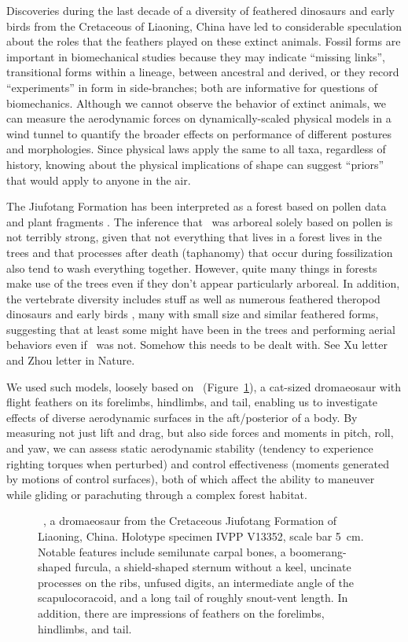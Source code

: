 Discoveries during the last decade of a diversity of feathered dinosaurs and early birds from the Cretaceous of Liaoning, China have led to considerable speculation about the roles that the feathers played on these extinct animals. Fossil forms are important in biomechanical studies because they may indicate ``missing links'', transitional forms within a lineage, between ancestral and derived, or they record ``experiments'' in form in side-branches; both are informative for questions of biomechanics.  Although we cannot observe the behavior of extinct animals, we can measure the aerodynamic forces on dynamically-scaled physical models in a wind tunnel to quantify the broader effects on performance of different postures and morphologies.  Since physical laws apply the same to all taxa, regardless of history, knowing about the physical implications of shape can suggest ``priors'' that would apply to anyone in the air. 
  
The Jiufotang Formation has been interpreted as a forest based on pollen data and plant fragments \cite{someone}.  The inference that \Mgui\ was arboreal solely based on pollen is not terribly strong, given that not everything that lives in a forest lives in the trees and that processes after death (taphanomy) that occur during fossilization also tend to wash everything together.  However, quite many things in forests make use of the trees even if they don't appear particularly arboreal. In addition, the vertebrate diversity includes stuff as well as numerous feathered theropod dinosaurs and early birds \cite{someone}, many with small size and similar feathered forms, suggesting that at least some might have been in the trees and performing aerial behaviors even if \Mgui\ was not. Somehow this needs to be dealt with. See Xu letter and Zhou letter in Nature. 
  
We used such models, loosely based on \Microraptorgui\ (Figure~\ref{fig:mgui}), a cat-sized dromaeosaur with flight feathers on its forelimbs, hindlimbs, and tail, enabling us to investigate effects of diverse aerodynamic surfaces in the aft/posterior of a body.  By measuring not just lift and drag, but also side forces and moments in pitch, roll, and yaw, we can assess static aerodynamic stability (tendency to experience righting torques when perturbed) and control effectiveness (moments generated by motions of control surfaces), both of which affect the ability to maneuver while gliding or parachuting through a complex forest habitat. 
\begin{figure}
\caption{%
{ \Microraptorgui\ \cite{Xu:2003}, a dromaeosaur from the Cretaceous Jiufotang Formation of Liaoning, China.}  Holotype specimen IVPP V13352, scale bar \SI{5}{\centi\meter}.  Notable features include semilunate carpal bones, a boomerang-shaped furcula, a shield-shaped sternum without a keel, uncinate processes on the ribs, unfused digits, an intermediate angle of the scapulocoracoid, and a long tail of roughly snout-vent length.  In addition, there are impressions of feathers on the forelimbs, hindlimbs, and tail.%
}
\label{fig:mgui} 
\end{figure}

